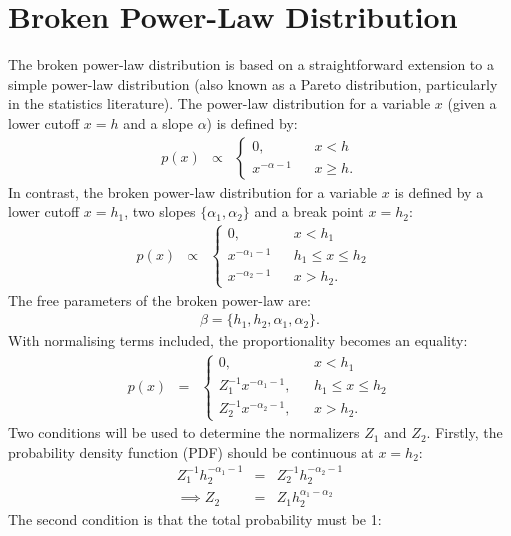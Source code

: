 \documentclass[manuscript]{aastex}
\begin{document}
\section{Broken Power-Law Distribution}\label{power_law}
The broken power-law distribution is based on a straightforward extension
to a simple power-law distribution (also known as a Pareto distribution,
particularly in the statistics literature). The power-law distribution for a
variable $x$ (given a lower cutoff $x=h$ and a slope $\alpha$) is defined by:
\begin{eqnarray}
p(x) &\propto&
\left\{
\begin{array}{lcl}
0, & & x < h \\
x^{-\alpha - 1} & & x \geq h.
\end{array}
\right.
\end{eqnarray}
In contrast, the broken power-law distribution for a variable $x$ is defined by
a lower cutoff $x=h_1$, two slopes $\{\alpha_1, \alpha_2\}$ and a break point
$x=h_2$:
\begin{eqnarray}
p(x) &\propto&
\left\{
\begin{array}{lcrl}
0, & & x < h_1 & \\
x^{-\alpha_1 - 1} & & h_1 \leq x \leq h_2 & \\
x^{-\alpha_2 - 1} & & x > h_2.
\end{array}
\right.
\end{eqnarray}
The free parameters of the broken power-law are:
\begin{eqnarray}
\beta = \{h_1, h_2, \alpha_1, \alpha_2\}.
\end{eqnarray}
With normalising terms included, the proportionality becomes an equality:
\begin{eqnarray}
p(x) &=&
\left\{
\begin{array}{lcr}
0, & & x < h_1 \\
Z_1^{-1}x^{-\alpha_1 - 1}, & & h_1 \leq x \leq h_2 \\
Z_2^{-1}x^{-\alpha_2 - 1}, & & x > h_2.
\end{array}
\right.
\end{eqnarray}
Two conditions will be used to determine the normalizers $Z_1$ and $Z_2$.
Firstly, the probability density function (PDF) should be continuous at $x=h_2$:
\begin{eqnarray}
Z_1^{-1}h_2^{-\alpha_1 - 1} &=& Z_2^{-1}h_2^{-\alpha_2 - 1}\\
\implies
Z_2 &=& Z_1h_2^{\alpha_1-\alpha_2}
\end{eqnarray}
The second condition is that the total probability must be 1:
\end{document}
